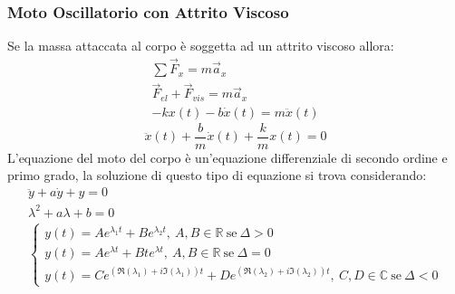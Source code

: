 \documentclass{article}
\numberwithin{equation}{subsection}
\begin{document}
\subsubsection{Moto Oscillatorio con Attrito Viscoso}
Se la massa attaccata al corpo è soggetta ad un attrito viscoso 
allora: 
\begin{gather*}
    \sum\vec{F}_x=m\vec{a}_x\\
     \vec{F}_{el}+\vec{F}_{vis}=m\vec{a}_x\\
      -kx(t)-b\dot x(t)=m\ddot x(t)
\end{gather*}
\begin{equation}
    \ddot x(t) +\displaystyle\frac{b}{m}\dot x(t) +\frac{k}{m}x(t)=0
\end{equation}
L'equazione del moto del corpo è un'equazione differenziale 
di secondo ordine e primo grado, la soluzione di questo tipo 
di equazione si trova considerando: 
\begin{gather*}
    \ddot y + a \dot y+y=0\\
    \lambda^{2}+a\lambda+b=0\\
    \begin{cases}
        \displaystyle y(t)=Ae^{\lambda_1t}+Be^{\lambda_2t},\:A,B\in\mathbb{R}\:\mbox{se}\: \Delta > 0\\
        \displaystyle y(t)=Ae^{\lambda t}+Bte^{\lambda t}, \:A,B\in\mathbb{R}\:\mbox{se}\: \Delta = 0\\
        \displaystyle y(t)=Ce^{(\Re(\lambda_1)+i\Im(\lambda_1))t} + De^{(\Re(\lambda_2)+i\Im(\lambda_2))t},\:C,D\in\mathbb{C}\:\mbox{se}\:\Delta < 0
    \end{cases}
\end{gather*} 
\end{document}
